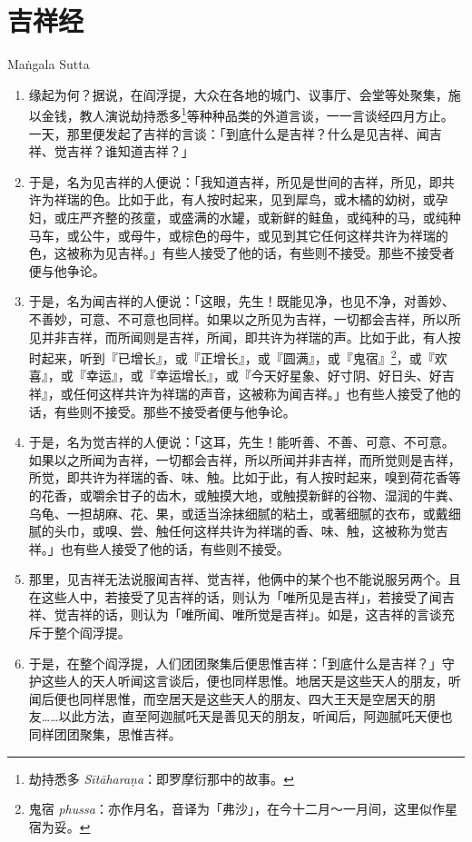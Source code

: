 \section{吉祥经}

\begin{center}Maṅgala Sutta\end{center}\vspace{1em}

\begin{enumerate}\item 缘起为何？据说，在阎浮提，大众在各地的城门、议事厅、会堂等处聚集，施以金钱，教人演说劫持悉多\footnote{劫持悉多 \textit{Sītāharaṇa}：即罗摩衍那中的故事。}等种种品类的外道言谈，一一言谈经四月方止。一天，那里便发起了吉祥的言谈：「到底什么是吉祥？什么是见吉祥、闻吉祥、觉吉祥？谁知道吉祥？」
\item 于是，名为见吉祥的人便说：「我知道吉祥，所见是世间的吉祥，所见，即共许为祥瑞的色。比如于此，有人按时起来，见到犀鸟，或木橘的幼树，或孕妇，或庄严齐整的孩童，或盛满的水罐，或新鲜的鲑鱼，或纯种的马，或纯种马车，或公牛，或母牛，或棕色的母牛，或见到其它任何这样共许为祥瑞的色，这被称为见吉祥。」有些人接受了他的话，有些则不接受。那些不接受者便与他争论。
\item 于是，名为闻吉祥的人便说：「这眼，先生！既能见净，也见不净，对善妙、不善妙，可意、不可意也同样。如果以之所见为吉祥，一切都会吉祥，所以所见并非吉祥，而所闻则是吉祥，所闻，即共许为祥瑞的声。比如于此，有人按时起来，听到『已增长』，或『正增长』，或『圆满』，或『鬼宿』\footnote{鬼宿 \textit{phussa}：亦作月名，音译为「弗沙」，在今十二月～一月间，这里似作星宿为妥。}，或『欢喜』，或『幸运』，或『幸运增长』，或『今天好星象、好寸阴、好日头、好吉祥』，或任何这样共许为祥瑞的声音，这被称为闻吉祥。」也有些人接受了他的话，有些则不接受。那些不接受者便与他争论。
\item 于是，名为觉吉祥的人便说：「这耳，先生！能听善、不善、可意、不可意。如果以之所闻为吉祥，一切都会吉祥，所以所闻并非吉祥，而所觉则是吉祥，所觉，即共许为祥瑞的香、味、触。比如于此，有人按时起来，嗅到荷花香等的花香，或嚼余甘子的齿木，或触摸大地，或触摸新鲜的谷物、湿润的牛粪、乌龟、一担胡麻、花、果，或适当涂抹细腻的粘土，或著细腻的衣布，或戴细腻的头巾，或嗅、尝、触任何这样共许为祥瑞的香、味、触，这被称为觉吉祥。」也有些人接受了他的话，有些则不接受。
\item 那里，见吉祥无法说服闻吉祥、觉吉祥，他俩中的某个也不能说服另两个。且在这些人中，若接受了见吉祥的话，则认为「唯所见是吉祥」，若接受了闻吉祥、觉吉祥的话，则认为「唯所闻、唯所觉是吉祥」。如是，这吉祥的言谈充斥于整个阎浮提。
\item 于是，在整个阎浮提，人们团团聚集后便思惟吉祥：「到底什么是吉祥？」守护这些人的天人听闻这言谈后，便也同样思惟。地居天是这些天人的朋友，听闻后便也同样思惟，而空居天是这些天人的朋友、四大王天是空居天的朋友……以此方法，直至阿迦腻吒天是善见天的朋友，听闻后，阿迦腻吒天便也同样团团聚集，思惟吉祥。

\end{enumerate}
